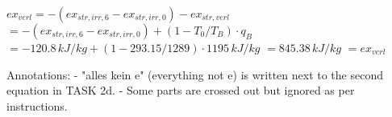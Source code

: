 \( ex_{verl} = - (ex_{str,irr,6} - ex_{str,irr,0}) - ex_{str,verl} \)  
\( = - (ex_{str,irr,6} - ex_{str,irr,0}) + (1 - T_0 / T_B) \cdot q_B \)  
\( = - 120.8 \, kJ/kg + (1 - 293.15 / 1289) \cdot 1195 \, kJ/kg \)  
\( = 845.38 \, kJ/kg \)  
\( = ex_{verl} \)  

Annotations:  
- "alles kein e" (everything not e) is written next to the second equation in TASK 2d.  
- Some parts are crossed out but ignored as per instructions.